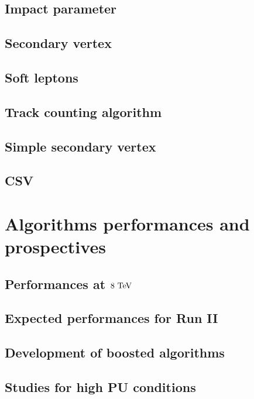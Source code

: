         \subsection{Impact parameter}
        \loremipsum
        \subsection{Secondary vertex}
        \loremipsum
        \subsection{Soft leptons}
        \loremipsum
        \subsection{Track counting algorithm}
        \loremipsum
        \subsection{Simple secondary vertex}
        \loremipsum
        \subsection{CSV}
        \loremipsum

    \section{Algorithms performances and prospectives}
        \loremipsum
        \subsection{Performances at $8~\text{TeV}$}
        \loremipsum
        \subsection{Expected performances for Run II}
        \loremipsum
        \subsection{Development of boosted algorithms}
        \loremipsum
        \subsection{Studies for high PU conditions}
        \loremipsum







